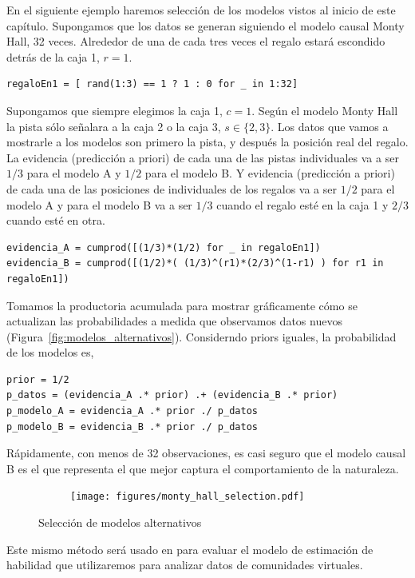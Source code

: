 \documentclass[a4paper,10pt]{book}
\theoremstyle{definition}
\begin{document}
En el siguiente ejemplo haremos selección de los modelos vistos al inicio de este capítulo.
%
Supongamos que los datos se generan siguiendo el modelo causal Monty Hall, 32 veces.
%
Alrededor de una de cada tres veces el regalo estará escondido detrás de la caja 1, $r=1$.
%
\begin{lstlisting}[backgroundcolor=\color{all}]
regaloEn1 = [ rand(1:3) == 1 ? 1 : 0 for _ in 1:32]
\end{lstlisting} 
%
Supongamos que siempre elegimos la caja 1, $c=1$.
%
Según el modelo Monty Hall la pista sólo señalara a la caja 2 o la caja 3, $s \in \{2,3\}$.
%
Los datos que vamos a mostrarle a los modelos son primero la pista, y después la posición real del regalo.
%
La evidencia (predicción a priori) de cada una de las pistas individuales va a ser $1/3$ para el modelo A y $1/2$ para el modelo B.
%
Y evidencia (predicción a priori) de cada una de las posiciones de individuales de los regalos va a ser $1/2$ para el modelo A y para el modelo B va a ser $1/3$ cuando el regalo esté en la caja 1 y $2/3$ cuando esté en otra.
%
\begin{lstlisting}[backgroundcolor=\color{all}]
evidencia_A = cumprod([(1/3)*(1/2) for _ in regaloEn1])
evidencia_B = cumprod([(1/2)*( (1/3)^(r1)*(2/3)^(1-r1) ) for r1 in regaloEn1])
\end{lstlisting} 
%
Tomamos la productoria acumulada para mostrar gráficamente cómo se actualizan las probabilidades a medida que observamos datos nuevos (Figura~\ref{fig:modelos_alternativos}).
%
Considerndo priors iguales, la probabilidad de los modelos es,
%
\begin{lstlisting}[backgroundcolor=\color{all}]
prior = 1/2
p_datos = (evidencia_A .* prior) .+ (evidencia_B .* prior)
p_modelo_A = evidencia_A .* prior ./ p_datos
p_modelo_B = evidencia_B .* prior ./ p_datos
\end{lstlisting} 
%
Rápidamente, con menos de 32 observaciones, es casi seguro que el modelo causal B es el que representa el que mejor captura el comportamiento de la naturaleza.
%
\begin{figure}[H]
    \centering
    \begin{subfigure}[b]{0.5\textwidth}
    \texttt{[image: figures/monty\_hall\_selection.pdf]}
    \end{subfigure}
    \caption{
    Selección de modelos alternativos
    }
    \label{fig:estrategias_individuales}
\end{figure}
%
Este mismo método será usado en para evaluar el modelo de estimación de habilidad que utilizaremos para analizar datos de comunidades virtuales.
\end{document}
